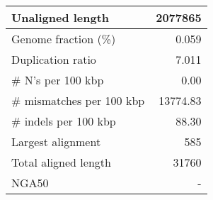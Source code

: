 \documentclass[12pt,a4paper]{article}
\begin{document}
\begin{table}[ht]
\begin{center}
\begin{tabular}{|l*{1}{|r}|}
Unaligned length & 2077865 \\ \hline
Genome fraction (\%) & 0.059 \\ \hline
Duplication ratio & 7.011 \\ \hline
\# N's per 100 kbp & 0.00 \\ \hline
\# mismatches per 100 kbp & 13774.83 \\ \hline
\# indels per 100 kbp & 88.30 \\ \hline
Largest alignment & 585 \\ \hline
Total aligned length & 31760 \\ \hline
NGA50 & - \\ \hline
\end{tabular}
\end{center}
\end{table}
\end{document}
